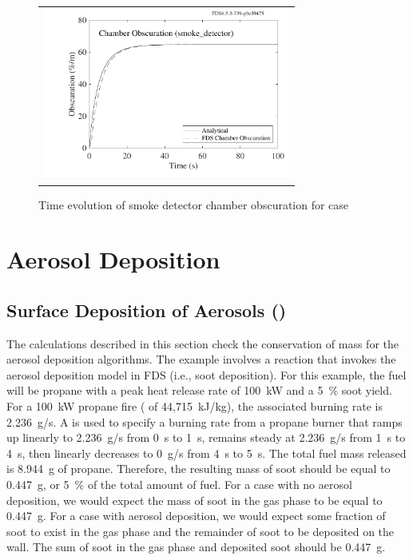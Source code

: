 \documentclass[11pt]{book}
\begin{document}
\begin{figure}[ht]
\centering
\begin{tabular}{c}
\includegraphics[width=3.2in]{SCRIPT_FIGURES/smoke_detector}
\end{tabular}
\caption[Smoke detector chamber obscuration for  case]{Time evolution of smoke detector chamber obscuration for  case}
\label{fig:smoke_detector}
\end{figure}

\clearpage

\section{Aerosol Deposition}

\subsection{Surface Deposition of Aerosols (\texorpdfstring{}{propane\_flame\_deposition})}
\label{propane_flame_deposition}

The calculations described in this section check the conservation of mass for the aerosol deposition algorithms. The example involves a reaction that invokes the aerosol deposition model in FDS (i.e., soot deposition). For this example, the fuel will be propane with a peak heat release rate of 100~kW and a 5~\% soot yield. For a 100~kW propane fire ( of 44,715~kJ/kg), the associated burning rate is 2.236~g/s. A  is used to specify a burning rate from a propane burner that ramps up linearly to 2.236~g/s from 0~s to 1~s, remains steady at 2.236~g/s from 1~s to 4~s, then linearly decreases to 0~g/s from 4~s to 5~s. The total fuel mass released is 8.944~g of propane. Therefore, the resulting mass of soot should be equal to 0.447~g, or 5~\% of the total amount of fuel. For a case with no aerosol deposition, we would expect the mass of soot in the gas phase to be equal to 0.447~g. For a case with aerosol deposition, we would expect some fraction of soot to exist in the gas phase and the remainder of soot to be deposited on the wall. The sum of soot in the gas phase and deposited soot should be 0.447~g.
\end{document}
